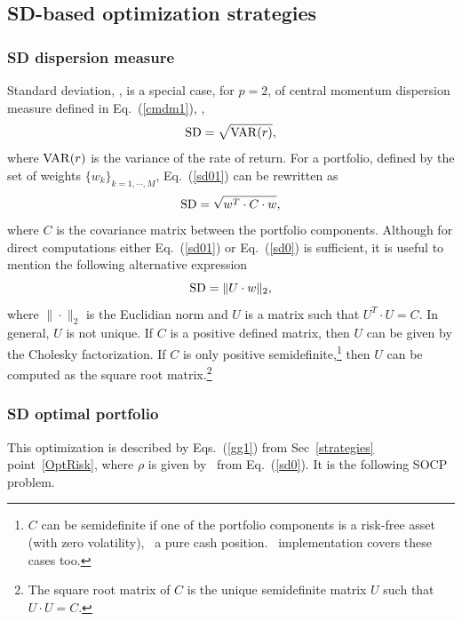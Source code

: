 
\subsection{SD-based optimization strategies}\label{S:SD}

\subsubsection{SD dispersion measure}

Standard deviation, \SD, is a special case, for $p=2$, of central momentum dispersion measure defined
in Eq.~(\ref{cmdm1}), \ie,
\begin{equation}
    \SD = \sqrt{\VAR(r)},
    \label{sd01}
\end{equation}
where ${\rm VAR}(r)$ is the variance of the rate of return. For a portfolio, defined by the set of weights $\{w_k\}_{k=1,\cdots,M}$,
Eq.~(\ref{sd01}) can be rewritten as
\begin{equation}
    \SD = \sqrt{w^T\cdot C\cdot w},
    \label{sd02}
\end{equation}
where $C$ is the covariance matrix between the portfolio components.
Although for direct computations either Eq.~(\ref{sd01}) or
Eq.~(\ref{sd0}) is sufficient, it is useful to mention the following alternative expression
\begin{equation}
    \SD = \| U\cdot w \|_2,
    \label{sd0}
\end{equation}
where $\|\cdot\|_2$ is the Euclidian norm and $U$ is a matrix such that $U^T\cdot U = C$. In general, $U$ is not unique.
If $C$ is a positive defined matrix, then $U$ can be given by the
Cholesky factorization. If $C$ is only positive semidefinite,\footnote{$C$ can be semidefinite if one of the portfolio components
is a risk-free asset (with zero volatility), \eg\ a pure cash position. \azapy\ implementation covers these cases too.} then $U$ can be computed as the
square root matrix.\footnote{The square root matrix of $C$ is the unique semidefinite matrix $U$ such that $U\cdot U = C$.}

\BackToContents


\subsubsection{SD optimal portfolio}
This optimization is described by Eqs.~(\ref{gg1}) from Sec~\ref{strategies} point~\ref{OptRisk},
where $\rho$ is given by \SD\ from Eq.\ (\ref{sd0}).
It is the following SOCP problem.

